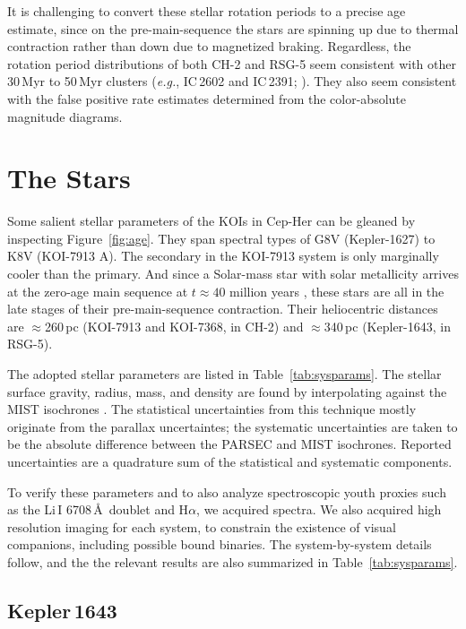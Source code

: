\documentclass[12pt,twocolumn,linenumbers]{aastex63}
\begin{document}
It is challenging to convert these stellar rotation periods
to a precise age estimate, since on the pre-main-sequence
the stars are spinning up due to thermal contraction
rather than down due to magnetized braking.  Regardless, the rotation
period distributions of both CH-2 and RSG-5 seem consistent with other
30\,Myr to 50\,Myr clusters ({\it e.g.}, IC\,2602 and IC\,2391;
\citealt{douglas_stephanie_t_2021_5131306}).
They also seem consistent with the false positive rate estimates
determined from the color-absolute magnitude diagrams.


\section{The Stars}
\label{sec:stars}



Some salient stellar parameters of the KOIs in Cep-Her can be gleaned
by inspecting Figure~\ref{fig:age}.  They span spectral types of G8V
(Kepler-1627) to K8V (KOI-7913 A).  The secondary in the KOI-7913
system is only marginally cooler than the primary.  And since a
Solar-mass star with solar metallicity arrives at the zero-age main
sequence at $t\approx40$ million years \citep{choi_mesa_2016}, these
stars are all in the late stages of their pre-main-sequence
contraction.  Their heliocentric distances are $\approx$260\,pc
(KOI-7913 and KOI-7368, in CH-2) and $\approx$340\,pc (Kepler-1643, in
RSG-5).

The adopted stellar parameters are listed in
Table~\ref{tab:sysparams}.  The stellar surface gravity, radius,
mass, and density are found by interpolating against the MIST
isochrones \citep{choi_mesa_2016}.  The statistical uncertainties from
this technique mostly originate from the parallax uncertaintes; the
systematic uncertainties are taken to be the absolute difference
between the PARSEC \citep{bressan_parsec_2012} and MIST isochrones.
Reported uncertainties are a quadrature sum of the statistical and
systematic components. 

To verify these parameters and to also analyze spectroscopic youth
proxies such as the Li\,\textsc{I} 6708\,\AA\ doublet and H$\alpha$,
we acquired spectra.  We also acquired high resolution imaging for
each system, to constrain the existence of visual companions,
including possible bound binaries.  The system-by-system details
follow, and the the relevant results are also summarized in
Table~\ref{tab:sysparams}.

\subsection{Kepler\,1643}
\end{document}
